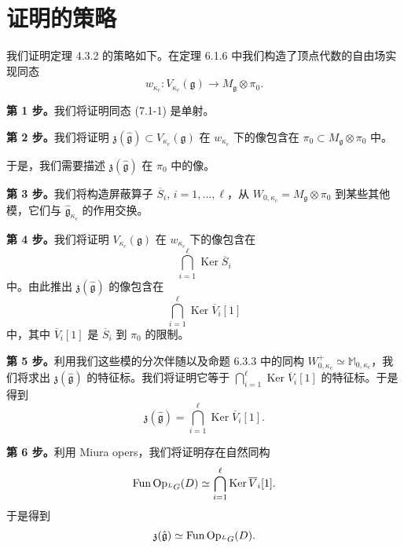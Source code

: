 \section{证明的策略}

我们证明定理 4.3.2 的策略如下。在定理 6.1.6 中我们构造了顶点代数的自由场实现同态
\begin{equation}
    w_{\kappa_c}:V_{\kappa_c}(\mathfrak{g})\longrightarrow M_{\mathfrak{g}}\otimes\pi_0.
    \tag{7.1-1}
\end{equation}

\textbf{第 1 步。}我们将证明同态 (7.1-1) 是单射。

\textbf{第 2 步。}我们将证明 $\mathfrak{z}(\hat{\mathfrak{g}})\subset V_{\kappa_c}(\mathfrak{g})$ 在 $w_{\kappa_c}$ 下的像包含在 $\pi_0\subset M_{\mathfrak{g}}\otimes\pi_0$ 中。

于是，我们需要描述 $\mathfrak{z}(\hat{\mathfrak{g}})$ 在 $\pi_0$ 中的像。

\textbf{第 3 步。}我们将构造屏蔽算子 $\overline{S}_i,\,i=1,\dots,\ell$，从 $W_{0,\kappa_c}=M_{\mathfrak{g}}\otimes\pi_0$ 到某些其他模，它们与 $\widehat{\mathfrak{g}}_{\kappa_c}$ 的作用交换。

\textbf{第 4 步。}我们将证明 $V_{\kappa_c}(\mathfrak{g})$ 在 $w_{\kappa_c}$ 下的像包含在
\[
    \bigcap_{i=1}^{\ell}\operatorname{Ker}\overline{S}_i
\]
中。由此推出 $\mathfrak{z}(\hat{\mathfrak{g}})$ 的像包含在
\[
    \bigcap_{i=1}^{\ell}\operatorname{Ker}\overline{V}_i[1]
\]
中，其中 $\overline{V}_i[1]$ 是 $\overline{S}_i$ 到 $\pi_0$ 的限制。

\textbf{第 5 步。}利用我们这些模的分次伴随以及命题 6.3.3 中的同构 $W^+_{0,\kappa_c}\simeq\mathbb{M}_{0,\kappa_c}$，我们将求出 $\mathfrak{z}(\hat{\mathfrak{g}})$ 的特征标。我们将证明它等于 $\bigcap_{i=1}^{\ell}\operatorname{Ker}\overline{V}_i[1]$ 的特征标。于是得到
\[
    \mathfrak{z}(\hat{\mathfrak{g}})=\bigcap_{i=1}^{\ell}\operatorname{Ker}\overline{V}_i[1].
\]

\textbf{第 6 步。}利用 Miura opers，我们将证明存在自然同构
\[
    \operatorname{Fun}\operatorname{Op}_{{}^LG}(D)\simeq\bigcap_{i=1}^{\ell}\operatorname{Ker}\overline{V}_i[1].
\]
于是得到
\[
    \mathfrak{z}(\hat{\mathfrak{g}})\simeq\operatorname{Fun}\operatorname{Op}_{{}^LG}(D).
\]

